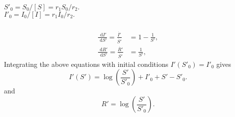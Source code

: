 \documentclass[]{article}
\newcommand{\bb}{\begin{equation}}
\newcommand{\ee}{\end{equation}}
\newcommand{\rd}{\text{ d}}
\renewcommand{\l}{\left(}
\renewcommand{\r}{\right)}
\begin{document}
\begin{Answ}
\subsubsection{}
$S'_0=S_0/[S]=r_1S_0/r_2.$\\
$I'_0=I_0/[I]=r_1I_0/r_2.$

\subsubsection{}
\begin{align}
\frac{\rd I'}{\rd S'}=\frac{\dot{I'}}{\dot{S'}}&=1-\frac{1}{S'},\nonumber\\
\frac{\rd R'}{\rd S'}=\frac{\dot{R'}}{\dot{S'}}&=\frac{1}{S'},\nonumber
\end{align}
Integrating the above equations with initial conditions $I'(S'_0)=I'_0$ gives
\bb
I'(S') = \log\l \frac{S'}{S'_0}\r+I'_0+S'-S'_0.
\ee
and
\bb
R'=\log\l \frac{S'}{S'_0}\r.
\ee
\end{Answ}
\end{document}
